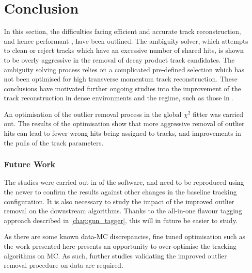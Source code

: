 



\section{Conclusion}\label{sec:trk_btag_conclusion}

In this section, the difficulties facing efficient and accurate  track reconstruction, and hence performant \btagging, have been outlined.
The ambiguity solver, which attempts to clean or reject tracks which have an excessive number of shared hits, is shown to be overly aggressive in the removal of \bhadron decay product track candidates.
The ambiguity solving process relies on a complicated pre-defined selection which has not been optimised for high transverse momentum \bhadron track reconstruction.
These conclusions have motivated further ongoing studies into the improvement of the track reconstruction in dense environments and the \highpt regime, such as those in .

An optimisation of the outlier removal process in the global $\chi^2$ fitter was carried out.
The results of the optimisation show that more aggressive removal of outlier hits can lead to fewer wrong hits being assigned to tracks, and improvements in the pulls of the track parameters.


\subsubsection{Future Work}
The studies were carried out in \rtwoone of the \ATLAS software, and need to be reproduced using the newer \rtwotwo to confirm the results against other changes in the baseline tracking configuration.
It is also necessary to study the impact of the improved outlier removal on the downstream \btagging algorithms.
Thanks to the all-in-one flavour tagging approach described in \cref{chap:gnn_tagger}, this will in future be easier to study.

As there are some known data-MC discrepancies, fine tuned optimisation such as the work presented here presents an opportunity to over-optimise the tracking algorithms on MC.
As such, further studies validating the improved outlier removal procedure on data are required.
